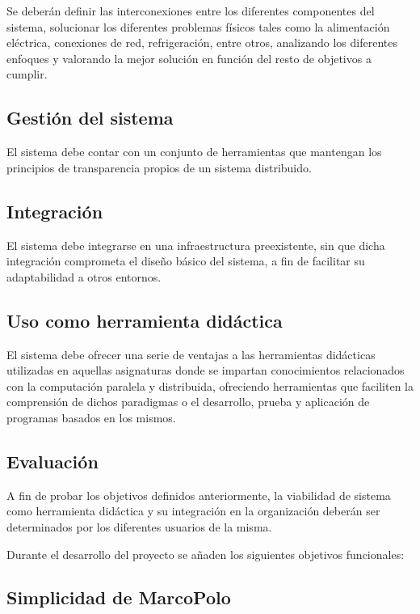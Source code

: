 Se deberán definir las interconexiones entre los diferentes componentes del sistema, solucionar los diferentes problemas físicos tales como la alimentación eléctrica, conexiones de red, refrigeración, entre otros, analizando los diferentes enfoques y valorando la mejor solución en función del resto de objetivos a cumplir.

\subsection{Gestión del sistema}

El sistema debe contar con un conjunto de herramientas que mantengan los principios de transparencia propios de un sistema distribuido\citationneeded.

\subsection{Integración}

El sistema debe integrarse en una infraestructura preexistente, sin que dicha integración comprometa el diseño básico del sistema, a fin de facilitar su adaptabilidad a otros entornos.

\subsection{Uso como herramienta didáctica}

El sistema debe ofrecer una serie de ventajas a las herramientas didácticas utilizadas en aquellas asignaturas donde se impartan conocimientos relacionados con la computación paralela y distribuida, ofreciendo herramientas que faciliten la comprensión de dichos paradigmas o el desarrollo, prueba y aplicación de programas basados en los mismos.

\subsection{Evaluación}

A fin de probar los objetivos definidos anteriormente, la viabilidad de sistema como herramienta didáctica y su integración en la organización deberán ser determinados por los diferentes usuarios de la misma.


Durante el desarrollo del proyecto se añaden los siguientes objetivos funcionales:

\subsection{Simplicidad de MarcoPolo}

